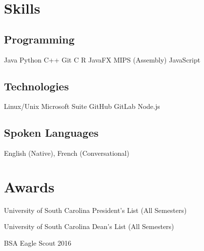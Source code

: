 \documentclass[letterpaper]{deedy-resume}
\begin{document}
\begin{minipage}[t]{0.29\textwidth}
\sectionspace

\section{Skills}

\subsection{Programming}
Java \textbullet{} Python \textbullet{} C++ \textbullet{} Git \textbullet{} C \textbullet{} R JavaFX MIPS (Assembly) \textbullet{} JavaScript
\sectionspace

\subsection{Technologies}
Linux/Unix \textbullet{} Microsoft Suite \textbullet{} GitHub GitLab \textbullet{}Node.js 
\sectionspace 

\subsection{Spoken Languages}
English (Native), French (Conversational)


\sectionspace

\section{Awards}
\vspace{0.2cm}
\setlength{\leftmargini}{1em}
\begin{tightitemize}
\item University of South Carolina President's List (All Semesters)
\item University of South Carolina Dean's List (All Semesters)
\item BSA Eagle Scout 2016
\end{tightitemize}


\sectionspace


\sectionspace 

\end{minipage} 
\hfill
%
%
\end{document}
